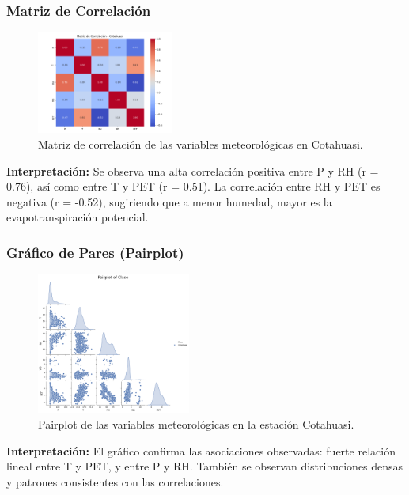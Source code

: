 \subsubsection*{Matriz de Correlación}
\begin{figure}[H]
\centering
\includegraphics[width=0.4\textwidth]{resultados/por_estacion_meteorologica/Cotahuasi/matriz_correlacion.png}
\caption{Matriz de correlación de las variables meteorológicas en Cotahuasi.}
\label{fig:cotahuasi_corr}
\end{figure}
\textbf{Interpretación:} Se observa una alta correlación positiva entre P y RH (r = 0.76), así como entre T y PET (r = 0.51). La correlación entre RH y PET es negativa (r = -0.52), sugiriendo que a menor humedad, mayor es la evapotranspiración potencial.

\subsubsection*{Gráfico de Pares (Pairplot)}
\begin{figure}[H]
\centering
\includegraphics[width=0.45\textwidth]{resultados/por_estacion_meteorologica/Cotahuasi/pairplot.png}
\caption{Pairplot de las variables meteorológicas en la estación Cotahuasi.}
\label{fig:cotahuasi_pairplot}
\end{figure}
\textbf{Interpretación:} El gráfico confirma las asociaciones observadas: fuerte relación lineal entre T y PET, y entre P y RH. También se observan distribuciones densas y patrones consistentes con las correlaciones.




